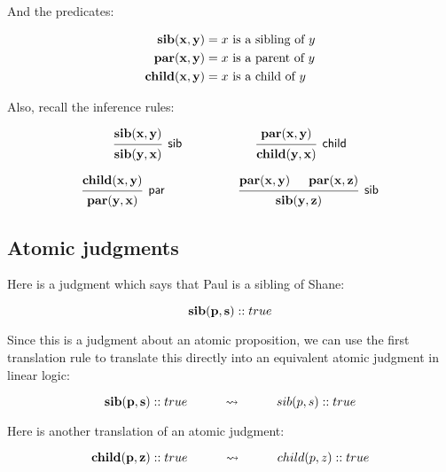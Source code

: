 \documentclass[../../../main.tex]{subfiles}
\begin{document}
\noindent
And the predicates:

\begin{align*}
  \mathbf{sib(x, y)} &= \text{$x$ is a sibling of $y$} \\
  \mathbf{par(x, y)} &= \text{$x$ is a parent of $y$} \\
  \mathbf{child(x, y)} &= \text{$x$ is a child of $y$} \\
\end{align*}

\noindent
Also, recall the inference rules:

$$
\begin{prooftree}
  \hypo{\nd{sib(x, y)}}
  \infer1[\rulename{sib}]{\nd{sib(y, x)}}
\end{prooftree}
\hskip 1cm ~ \hskip 1cm
\begin{prooftree}
  \hypo{\nd{par(x, y)}}
  \infer1[\rulename{child}]{\nd{child(y, x)}}
\end{prooftree}
$$

$$
\begin{prooftree}
  \hypo{\nd{child(x, y)}}
  \infer1[\rulename{par}]{\nd{par(y, x)}}
\end{prooftree}
\hskip 1cm ~ \hskip 1cm
\begin{prooftree}
  \hypo{\nd{par(x, y)}}
  \hypo{\nd{par(x, z)}}
  \infer2[\rulename{sib}]{\nd{sib(y, z)}}
\end{prooftree}
$$


\subsection{Atomic judgments}

Here is a judgment which says that Paul is a sibling of Shane:

\begin{equation*}
  \mathbf{sib(p, s)} :: true
\end{equation*}

\noindent
Since this is a judgment about an atomic proposition, we can use the first translation rule to translate this directly into an equivalent atomic judgment in linear logic:

\begin{equation*}
    \mathbf{sib(p, s)} :: true \hskip 1cm \rightsquigarrow \hskip 1cm sib(p, s) :: true
\end{equation*}

\noindent
Here is another translation of an atomic judgment:

\begin{equation*}
    \mathbf{child(p, z)} :: true \hskip 1cm \rightsquigarrow \hskip 1cm child(p, z) :: true
\end{equation*}
\end{document}
